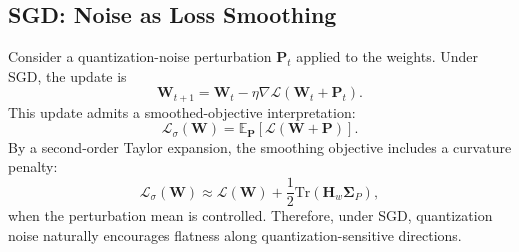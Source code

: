 \documentclass[journal]{IEEEtran}
\begin{document}
\subsection{SGD: Noise as Loss Smoothing}
Consider a quantization-noise perturbation $\boldsymbol{P}_t$ applied to the weights. Under SGD, the update is
\begin{equation}
    \boldsymbol{W}_{t+1}
    =
    \boldsymbol{W}_{t}
    -
    \eta
    \nabla
    \mathcal{L}
    (
    \boldsymbol{W}_{t}
    +
    \boldsymbol{P}_{t}
    ).
\end{equation}
This update admits a smoothed-objective interpretation:
\begin{equation}
    \mathcal{L}_{\sigma}(\boldsymbol{W})
    =
    \mathbb{E}_{\boldsymbol{P}}
    [
    \mathcal{L}(\boldsymbol{W}+\boldsymbol{P})
    ].
\end{equation}
By a second-order Taylor expansion, the smoothing objective includes a curvature penalty:
\begin{equation}
    \mathcal{L}_{\sigma}(\boldsymbol{W})
    \approx
    \mathcal{L}(\boldsymbol{W})
    +
    \frac{1}{2}
    \mathrm{Tr}
    (
    \boldsymbol{H}_w
    \boldsymbol{\Sigma}_P
    ),
\end{equation}
when the perturbation mean is controlled. Therefore, under SGD, quantization noise naturally encourages flatness along quantization-sensitive directions.
\end{document}
